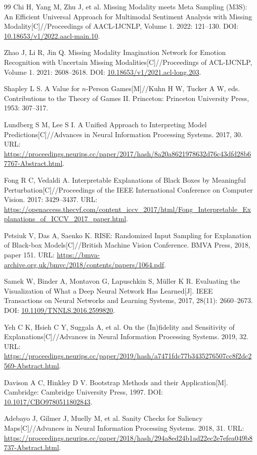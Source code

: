 {\begin{thebibliography}{99}
 Chi H, Yang M, Zhu J, et al. Missing Modality meets Meta Sampling (M3S): An Efficient Universal Approach for Multimodal Sentiment Analysis with Missing Modality[C]//Proceedings of AACL-IJCNLP, Volume 1. 2022: 121--130. DOI: \url{10.18653/v1/2022.aacl-main.10}.

 Zhao J, Li R, Jin Q. Missing Modality Imagination Network for Emotion Recognition with Uncertain Missing Modalities[C]//Proceedings of ACL-IJCNLP, Volume 1. 2021: 2608--2618. DOI: \url{10.18653/v1/2021.acl-long.203}.

 Shapley L S. A Value for $n$-Person Games[M]//Kuhn H W, Tucker A W, eds. Contributions to the Theory of Games II. Princeton: Princeton University Press, 1953: 307--317.

 Lundberg S M, Lee S I. A Unified Approach to Interpreting Model Predictions[C]//Advances in Neural Information Processing Systems. 2017, 30. URL: \url{https://proceedings.neurips.cc/paper/2017/hash/8a20a8621978632d76c43dfd28b67767-Abstract.html}.

 Fong R C, Vedaldi A. Interpretable Explanations of Black Boxes by Meaningful Perturbation[C]//Proceedings of the IEEE International Conference on Computer Vision. 2017: 3429--3437. URL: \url{https://openaccess.thecvf.com/content_iccv_2017/html/Fong_Interpretable_Explanations_of_ICCV_2017_paper.html}.

 Petsiuk V, Das A, Saenko K. RISE: Randomized Input Sampling for Explanation of Black-box Models[C]//British Machine Vision Conference. BMVA Press, 2018, paper 151. URL: \url{https://bmva-archive.org.uk/bmvc/2018/contents/papers/1064.pdf}.

 Samek W, Binder A, Montavon G, Lapuschkin S, M\"uller K R. Evaluating the Visualization of What a Deep Neural Network Has Learned[J]. IEEE Transactions on Neural Networks and Learning Systems, 2017, 28(11): 2660--2673. DOI: \url{10.1109/TNNLS.2016.2599820}.

 Yeh C K, Hsieh C Y, Suggala A, et al. On the (In)fidelity and Sensitivity of Explanations[C]//Advances in Neural Information Processing Systems. 2019, 32. URL: \url{https://proceedings.neurips.cc/paper/2019/hash/a7471fdc77b3435276507cc8f2dc2569-Abstract.html}.

 Davison A C, Hinkley D V. Bootstrap Methods and their Application[M]. Cambridge: Cambridge University Press, 1997. DOI: \url{10.1017/CBO9780511802843}.

 Adebayo J, Gilmer J, Muelly M, et al. Sanity Checks for Saliency Maps[C]//Advances in Neural Information Processing Systems. 2018, 31. URL: \url{https://proceedings.neurips.cc/paper/2018/hash/294a8ed24b1ad22ec2e7efea049b8737-Abstract.html}.


\end{thebibliography}
}
